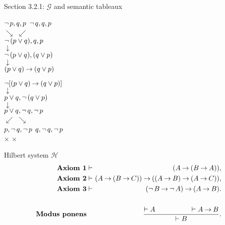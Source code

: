 \documentclass[style=simple,size=12pt]{powerdot}
\begin{document}
\begin{wideslide}[bm=,toc=]{Section 3.2.1: $\mathcal{G}$ and semantic
tableaux}
\vspace*{1ex}
\begin{minipage}[b]{0.45\textwidth}
\begin{center}
$\mathop{\neg} p, q, p$ \hspace{3em} $\mathop{\neg} q, q, p$ \\
$\searrow$ \hspace{2em} $\swarrow$ \\
$\mathop{\neg}\,(p\vee q),q,p$ \\
$\downarrow$ \\
$\mathop{\neg}\,(p\vee q),(q\vee p)$ \\
$\downarrow$ \\
$(p\vee q)\mathbin{\rightarrow} (q\vee p)$
\end{center}
\end{minipage}
\hspace{0.05\textwidth}
\begin{minipage}[b]{0.45\textwidth}
\begin{center}
$\mathop{\neg} [(p\vee q)\mathbin{\rightarrow} (q\vee p)]$ \\
$\downarrow$ \\
$p\vee q,\mathop{\neg}\,(q\vee p)$ \\
$\downarrow$ \\
$p\vee q,\mathop{\neg} q, \mathop{\neg} p$ \\
$\swarrow$ \hspace{2em} $\searrow$ \\
$p,\mathop{\neg} q,\mathop{\neg} p$ \hspace{3em} $q, \mathop{\neg} q, \mathop{\neg} p$ \\
$\times$ \hspace{5em} $\times$
\end{center}
\end{minipage}
\end{wideslide}

\begin{wideslide}[bm=,toc=]{Hilbert system $\mathcal{H}$}
\begin{eqnarray*}
\textrm{\bf Axiom 1} & \vdash\!\!\!\! & (A\imp(B\imp A)),\\
\textrm{\bf Axiom 2} & \vdash\!\!\!\! & (A\imp (B \imp C))  \imp ((A\imp B) \imp
(A\imp C)),\\
\textrm{\bf Axiom 3} & \vdash\!\!\!\! & (\ngg B \imp \ngg A) \imp (A
\imp B).\\
\mbox{}\\
\textrm{\bf Modus ponens} & & \frac{\vdash A\hspace{5em}\vdash A\imp B}{\vdash B}.
\end{eqnarray*}
\end{wideslide}
\end{document}
